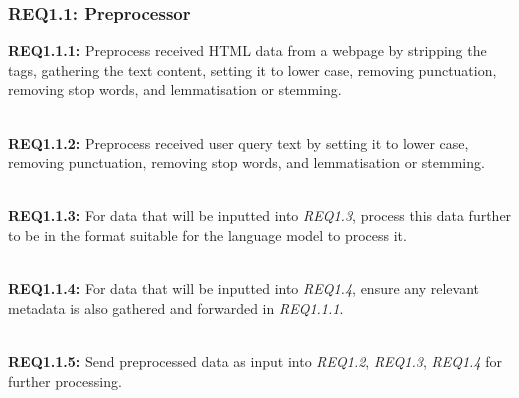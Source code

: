 \subsubsection{REQ1.1: Preprocessor}

\textbf{REQ1.1.1:} Preprocess received HTML data from a webpage by stripping the tags, gathering the text content, setting it to lower case, removing punctuation, removing stop words, and lemmatisation or stemming.\par

\textbf{\\REQ1.1.2:} Preprocess received user query text by setting it to lower case, removing punctuation, removing stop words, and lemmatisation or stemming.\par

\textbf{\\REQ1.1.3:} For data that will be inputted into \textit{REQ1.3}, process this data further to be in the format suitable for the language model to process it.\par

\textbf{\\REQ1.1.4:} For data that will be inputted into \textit{REQ1.4}, ensure any relevant metadata is also gathered and forwarded in \textit{REQ1.1.1}.\par

\textbf{\\REQ1.1.5:} Send preprocessed data as input into \textit{REQ1.2}, \textit{REQ1.3}, \textit{REQ1.4} for further processing.\par
